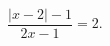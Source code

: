 \begin{ex}[type=equation]
	\begin{condition}
		$\dfrac{\big|x - 2\big| - 1}{2x - 1} = 2.$
	\end{condition}
\end{ex}
